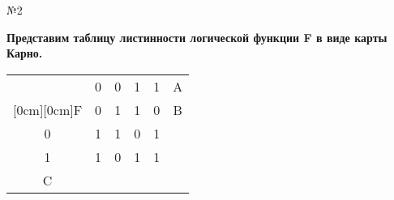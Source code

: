 \documentclass[]{article}
\begin{document}
	\vspace{20pt}
	\centering
	\normalsize
	\begin{center}\begin{large}{№2}\end{large}\end{center}
	\textbf{Представим таблицу листинности логической функции F в виде карты Карно.}
	
	\centering
	\normalsize
	
	
	\begin{tabular}{|c|c|c|c|c|c|}
	\hline
	&0&0&1&1&A \\
	\cline{2-6}
	\raisebox{1.5ex}[0cm][0cm]{F}
	&0&1&1&0&B \\
	\hline
	0&1&1&0&1 \\
	\cline{1-5}
	1&1&0&1&1\\
	\cline{1-5}
	C\\
	\cline{1-1}
	
\end{tabular}
	
\end{document}
